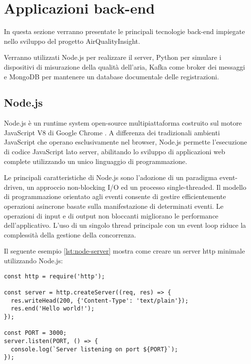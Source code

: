 \section{Applicazioni back-end}

In questa sezione verranno presentate le principali tecnologie back-end impiegate nello sviluppo del progetto
AirQualityInsight.

Verranno utilizzati Node.js per realizzare il server, Python per simulare i dispositivi di misurazione della
qualità dell'aria, Kafka come broker dei messaggi e MongoDB per mantenere un database documentale delle registrazioni.

\subsection{Node.js}

Node.js è un runtime system open-source multipiattaforma costruito sul motore JavaScript V8
di Google Chrome \citep{capan_2013_nodejs}. A differenza dei tradizionali ambienti JavaScript che operano esclusivamente
nel browser, Node.js permette l'esecuzione di codice JavaScript lato server, abilitando lo sviluppo di applicazioni web
complete utilizzando un unico linguaggio di programmazione.

Le principali caratteristiche di Node.js sono l'adozione di un paradigma event-driven,
un approccio non-blocking I/O ed un processo single-threaded. Il modello di programmazione orientato agli eventi
consente di gestire efficientemente operazioni asincrone basate sulla manifestazione di determinati eventi.
Le operazioni di input e di output non bloccanti migliorano le performance dell'applicativo.
L'uso di un singolo thread principale con un event loop riduce la complessità della gestione della concorrenza.

Il seguente esempio \ref{lst:node-server} mostra come creare un server \acrshort{http} minimale utilizzando Node.js:

\begin{lstlisting}[caption={Server \acrshort{http} base in Node.js}, label=lst:node-server]
const http = require('http');

const server = http.createServer((req, res) => {
  res.writeHead(200, {'Content-Type': 'text/plain'});
  res.end('Hello world!');
});

const PORT = 3000;
server.listen(PORT, () => {
  console.log(`Server listening on port ${PORT}`);
});
\end{lstlisting}

